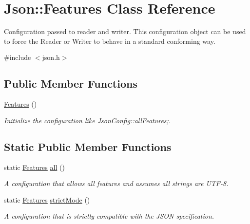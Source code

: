 \hypertarget{classJson_1_1Features}{}\section{Json\+:\+:Features Class Reference}
\label{classJson_1_1Features}


Configuration passed to reader and writer. This configuration object can be used to force the Reader or Writer to behave in a standard conforming way.  




{\ttfamily \#include $<$json.\+h$>$}

\subsection*{Public Member Functions}
\begin{DoxyCompactItemize}
\item 
\hyperlink{classJson_1_1Features_ad15a091cb61bb31323299a95970d2644_ad15a091cb61bb31323299a95970d2644}{Features} ()
\begin{DoxyCompactList}\small\item\em Initialize the configuration like Json\+Config\+::all\+Features;. \end{DoxyCompactList}\end{DoxyCompactItemize}
\subsection*{Static Public Member Functions}
\begin{DoxyCompactItemize}
\item 
static \hyperlink{classJson_1_1Features}{Features} \hyperlink{classJson_1_1Features_a63894da6e2c100b38741fa933f3d33ae_a63894da6e2c100b38741fa933f3d33ae}{all} ()
\begin{DoxyCompactList}\small\item\em A configuration that allows all features and assumes all strings are U\+T\+F-\/8. \end{DoxyCompactList}\item 
static \hyperlink{classJson_1_1Features}{Features} \hyperlink{classJson_1_1Features_ae23176c14b2e79e81fb61fb1a8ab58ee_ae23176c14b2e79e81fb61fb1a8ab58ee}{strict\+Mode} ()
\begin{DoxyCompactList}\small\item\em A configuration that is strictly compatible with the J\+S\+ON specification. \end{DoxyCompactList}\end{DoxyCompactItemize}
